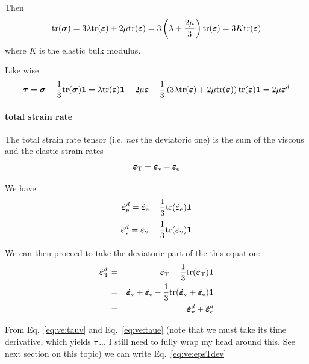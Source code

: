Then 
\begin{equation}
{\rm tr}({\bm \sigma}) 
= 3 \lambda {\rm tr}({\bm \varepsilon}) + 2 \mu {\rm tr}({\bm \varepsilon}) 
= 3 \left(\lambda + \frac{2\mu}{3}\right) {\rm tr}({\bm \varepsilon})
= 3 K {\rm tr}({\bm \varepsilon}) \label{eq:trsigmae}
\end{equation}
where $K$ is the elastic bulk modulus.

Like wise 
\begin{equation}
{\bm \tau} 
= {\bm \sigma} - \frac13 {\rm tr}({\bm \sigma}) {\bm 1}
= \lambda {\rm tr}({\bm \varepsilon}) {\bm 1} + 2 \mu {\bm \varepsilon}
- \frac13 \left(    3 \lambda {\rm tr}({\bm \varepsilon}) + 2 \mu {\rm tr}({\bm \varepsilon})    \right) {\rm tr}({\bm \varepsilon}) {\bm 1}
= 2 \mu {\bm \varepsilon}^d\label{eq:ve:taue}
\end{equation}

\paragraph{total strain rate}

The total strain rate tensor (i.e. {\it not} the deviatoric one) is the sum of the viscous and the elastic 
strain rates
\begin{equation}
\dot{\bm \varepsilon}_{\rm T} = \dot{\bm \varepsilon}_{\rm v} + \dot{\bm \varepsilon}_{\rm e}
\label{eq:ve:epsT} 
\end{equation}

We have
\[
\dot{\bm\varepsilon}_{\rm e}^d = 
\dot{\bm\varepsilon}_{\rm e}  - \frac13 {\rm tr} (\dot{\bm\varepsilon}_{\rm e}) {\bm 1} 
\]
\[
\dot{\bm\varepsilon}_{\rm v}^d = 
\dot{\bm\varepsilon}_{\rm v}  - \frac13 {\rm tr} (\dot{\bm\varepsilon}_{\rm v}) {\bm 1} 
\]

We can then proceed to take the deviatoric part of the this equation: 
\begin{eqnarray}
\dot{\bm \varepsilon}_{\rm T}^d 
&=& 
\dot{\bm \varepsilon}_{\rm T} - \frac13 {\rm tr}(\dot{\bm \varepsilon}_{\rm T}) {\bm 1} \nonumber\\
&=& \dot{\bm \varepsilon}_{\rm v} + \dot{\bm \varepsilon}_{\rm e} 
- \frac13 {\rm tr}( \dot{\bm \varepsilon}_{\rm v} + \dot{\bm \varepsilon}_{\rm e} ) {\bm 1} \nonumber\\
&=& \dot{\bm \varepsilon}_{\rm v}^d + \dot{\bm \varepsilon}_{\rm e}^d  \label{eq:ve:epsTdev}
\end{eqnarray}


From Eq.~\eqref{eq:ve:tauv} and Eq.~\eqref{eq:ve:taue} 
(note that we must take its time derivative, 
which yields $\check{\bm\tau}$... I still need to fully wrap my head around this. 
See next section on this topic) we can write Eq.~\eqref{eq:ve:epsTdev}


